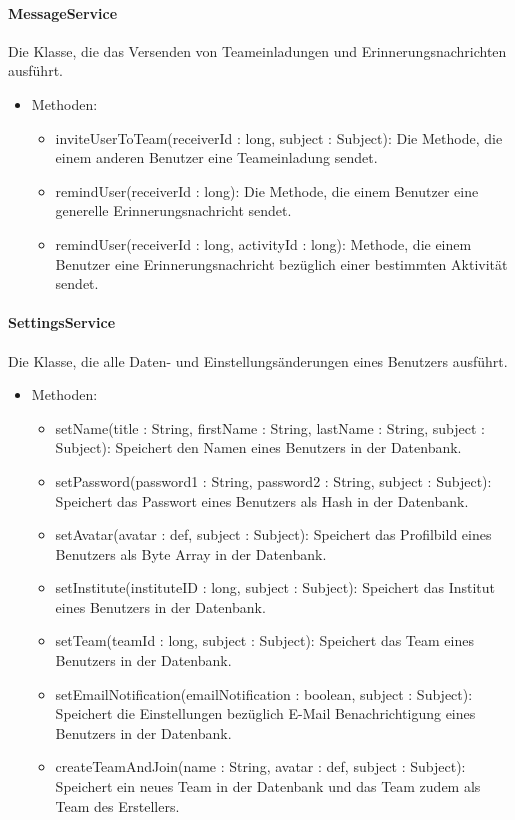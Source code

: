 	\paragraph{MessageService}Die Klasse, die das Versenden von Teameinladungen und Erinnerungsnachrichten ausf\"uhrt.
		\begin{itemize}
			\item Methoden:
			\begin{itemize}
				\item inviteUserToTeam(receiverId : long, subject : Subject): Die Methode, die einem anderen Benutzer eine Teameinladung sendet.
				\item remindUser(receiverId : long): Die Methode, die einem Benutzer eine generelle Erinnerungsnachricht sendet.
				\item remindUser(receiverId : long, activityId : long): Methode, die einem Benutzer eine Erinnerungsnachricht bez\"uglich einer bestimmten Aktivit\"at sendet.
			\end{itemize}
		\end{itemize}
	\paragraph{SettingsService}Die Klasse, die alle Daten- und Einstellungs\"anderungen eines Benutzers ausf\"uhrt.
		\begin{itemize}
			\item Methoden:
			\begin{itemize}
				\item setName(title : String, firstName : String, lastName : String, subject : Subject): Speichert den Namen eines Benutzers in der Datenbank.
				\item setPassword(password1 : String, password2 : String, subject : Subject): Speichert das Passwort eines Benutzers als Hash in der Datenbank.
				\item setAvatar(avatar : def, subject : Subject): Speichert das Profilbild eines Benutzers als Byte Array in der Datenbank.
				\item setInstitute(instituteID : long, subject : Subject): Speichert das Institut eines Benutzers in der Datenbank.
				\item setTeam(teamId : long, subject : Subject): Speichert das Team eines Benutzers in der Datenbank.
				\item setEmailNotification(emailNotification : boolean, subject : Subject): Speichert die Einstellungen bez\"uglich E-Mail Benachrichtigung eines Benutzers in der Datenbank.
				\item createTeamAndJoin(name : String, avatar : def, subject : Subject): Speichert ein neues Team in der Datenbank und das Team zudem als Team des Erstellers.
			\end{itemize}
		\end{itemize}
